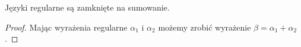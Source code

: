 \begin{theorem}
	Języki regularne są zamknięte na sumowanie.
\end{theorem}
\begin{proof}
	Mając wyrażenia regularne \(\alpha_1\) i \(\alpha_2\) możemy zrobić wyrażenie \(\beta = \alpha_1 + \alpha_2\).
\end{proof}
